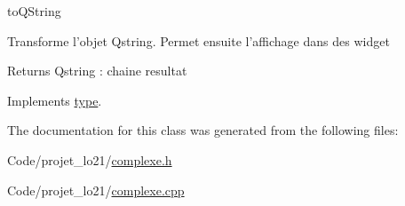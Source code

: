 to\-Q\-String 

Transforme l'objet Qstring. Permet ensuite l'affichage dans des widget \begin{DoxyReturn}{Returns}
Qstring \-: chaine resultat 
\end{DoxyReturn}


Implements \hyperlink{classtype_ab61f01d56f3896cc99788a1a18c4b0c2}{type}.



The documentation for this class was generated from the following files\-:\begin{DoxyCompactItemize}
\item 
Code/projet\-\_\-lo21/\hyperlink{complexe_8h}{complexe.\-h}\item 
Code/projet\-\_\-lo21/\hyperlink{complexe_8cpp}{complexe.\-cpp}\end{DoxyCompactItemize}

